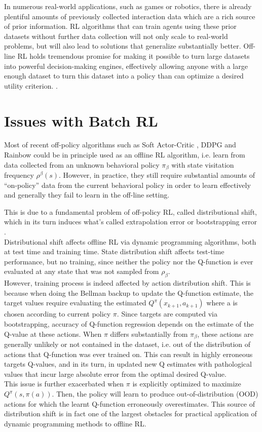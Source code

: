 In numerous real-world applications, such as games or robotics, there is already plentiful amounts 
of previously collected interaction data which are a rich source of prior information.
RL algorithms that can train agents using these prior datasets without further data collection
will not only scale to real-world problems, but will also lead to solutions that generalize substantially better.
Off-line RL holds tremendous promise for making it possible to turn large datasets into powerful 
decision-making engines, effectively allowing anyone with a large enough dataset to turn this dataset
into a policy than can optimize a desired utility criterion. \citep{levine2020}.


\section{Issues with Batch RL}

Most of recent off-policy algorithms such as Soft Actor-Critic \citep{Haarnoja2018}, 
DDPG \citep{Lillicrap2016} and Rainbow \citep{Hessel2018}  could be in principle used 
as an offline RL algorithm, i.e. learn from data collected from an unknown behavioral policy
$\pi_\beta$ with state visitation frequency $\rho^\beta(s)$. 
However, in practice, they still require substantial amounts
of “on-policy” data from the current behavioral policy in order to learn effectively 
and generally they fail to learn in the off-line setting.

This is due to a fundamental problem of off-policy RL, called distributional shift, which in 
its turn induces what's called extrapolation error \citep{Fujimoto2019} or bootstrapping error \citet{Kumar2019}.\\
Distributional shift affects offline RL via dynamic programming algorithms, both at test time and training time.
State distribution shift affects test-time performance, but no training, since neither the policy nor
the Q-function is ever evaluated at any state that was not sampled from $\rho_\beta$.\\
However, training process is indeed affected by action distribution shift.
This is because when doing the Bellman backup to update the Q-function estimate,
the target values require evaluating the estimated $Q^\pi(x_{k+1},a_{k+1})$ where
a is chosen according to current policy $\pi$.
Since targets are computed via bootstrapping, accuracy of Q-function regression depends
on the estimate of the Q-value at these actions. When $\pi$ differs substantially from $\pi_\beta$, 
these actions are generally unlikely or not contained in the dataset, i.e.
out of the distribution of actions that Q-function was ever trained on. This can result
in highly erroneous targets Q-values, and in its turn, in updated new Q estimates 
with pathological values that incur large absolute error from the optimal desired Q-value.\\
This issue is further exacerbated when $\pi$ is explicitly optimized to maximize $Q^\pi(s,\pi(a))$.
Then, the policy will learn to produce out-of-distribution (OOD) actions
for which the learnt Q-function erroneously overestimates.
This source of distribution shift is in fact one of the largest obstacles for practical application
of dynamic programming methods to offline RL.

